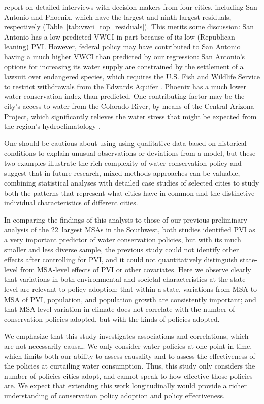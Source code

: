 \documentclass[draft,linenumbers]{agujournal}
\begin{document}
\citet{brown:politics:2016} report on detailed interviews with decision-makers
from four cities, including San Antonio and Phoenix, which have the largest
and ninth-largest residuals, respectively
(Table~\ref{tab:vwci_top_residuals}).
This merits some discussion:
San Antonio has a low predicted VWCI in part
because of its low (Republican-leaning) PVI. However, federal policy may have
contributed to San Antonio having a much higher VWCI than predicted by our
regression: San Antonio's options for increasing its water supply are
constrained by the settlement of a lawsuit over endangered species, which
requires the U.S. Fish and Wildlife Service to restrict withdrawals from the
Edwards Aquifer \citep{brown:politics:2016}.
Phoenix has a much lower water conservation index than predicted.
One contributing factor may be the city's access to water from the Colorado River,
by means of the Central Arizona Project, which significantly relieves the
water stress that might be expected from the region's hydroclimatology
\citep{brown:politics:2016}.

One should be cautious about using using qualitative data based on historical
conditions to explain unusual observations or deviations from a model,
but these two examples illustrate the rich complexity of water conservation
policy and suggest that in future research, mixed-methods approaches
can be valuable, combining statistical analyses with detailed case studies
of selected cities to study both the patterns that represent what cities
have in common and the distinctive individual characteristics of different cities.

In comparing the findings of this analysis to those of our previous preliminary
analysis of the 22~largest MSAs in the Southwest, both studies identified PVI as
a very important predictor of water conservation policies, but with its much
smaller and less diverse sample, the previous study could not identify other
effects after controlling for PVI, and it could not quantitatively distinguish
state-level from MSA-level effects of PVI or other covariates. Here we observe
clearly that variations in both environmental and societal characteristics at
the state level are relevant to policy adoption; that within a state, variations
from MSA to MSA of PVI, population, and population growth are consistently
important; and that MSA-level variation in climate does not
correlate with
the number of conservation policies adopted, but
with
the kinds of policies adopted.

We emphasize that this study investigates associations and correlations, which
are not necessarily causal.
We only consider water policies at one point in time, which limits both our
ability to assess causality and to assess the effectiveness of the policies
at curtailing water consumption.
Thus, this study only considers the number of
policies cities adopt, and cannot speak to how effective those policies are.
We expect that extending this work longitudinally would provide a richer
understanding of conservation policy adoption and policy effectiveness.
\end{document}
